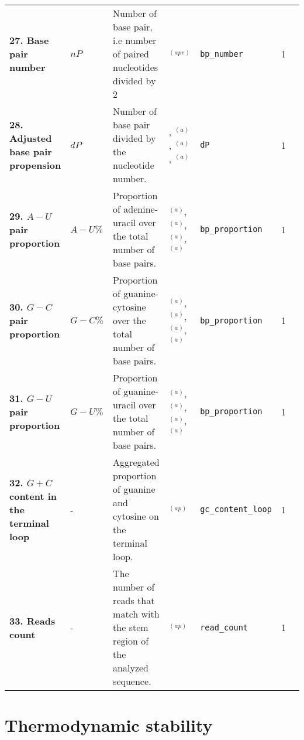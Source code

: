\documentclass[a4paper,10pt]{article}
\begin{document}
\begin{longtable}{ >{\raggedright\arraybackslash}p{4.2cm}  p{1.6cm}  p{5.8cm}  p{1.2cm}  l  cp{1cm} }
\bfseries{27. Base pair number} & $nP$ & Number of base pair, i.e number of paired nucleotides divided by 2 & \cite{MM06}$^{(apv)}$ & \verb|bp_number| & 1 \\

\bfseries{28. Adjusted base pair propension} & $dP$ & Number of base pair divided by the nucleotide number. & \cite{KS07}, \cite{RV09}$^{(a)}$, \cite{JS10}$^{(a)}$, \cite{PM11}$^{(a)}$ & \verb|dP| & 1 \\

\bfseries{29. $A-U$ pair proportion} & $A-U\%$ & Proportion of adenine-uracil over the total number of base pairs. & \cite{SP05}$^{(a)}$, \cite{RV09}$^{(a)}$, \cite{JS10}$^{(a)}$, \cite{PM11}$^{(a)}$ & \verb|bp_proportion| & 1 \\

 \bfseries{30. $G-C$ pair proportion} & $G-C\%$ & Proportion of guanine-cytosine over the total number of base pairs. & \cite{SP05}$^{(a)}$, \cite{RV09}$^{(a)}$, \cite{JS10}$^{(a)}$, \cite{PM11}$^{(a)}$ & \verb|bp_proportion| & 1 \\

 \bfseries{31. $G-U$ pair proportion} & $G-U\%$ & Proportion of guanine-uracil over the total number of base pairs. & \cite{SP05}$^{(a)}$, \cite{RV09}$^{(a)}$, \cite{JS10}$^{(a)}$, \cite{PM11}$^{(a)}$ & \verb|bp_proportion| & 1 \\

\bfseries{32. $G+C$ content in the terminal loop} & - & Aggregated proportion of guanine and cytosine on the terminal loop. & \cite{MM09}$^{(ap)}$ & \verb|gc_content_loop| & 1 \\

\bfseries{33. Reads count} & - & The number of reads that match with the stem region of the analyzed sequence.  & \cite{MM09}$^{(ap)}$ & \verb|read_count| & 1 \\

\end{longtable}




\newpage





\section{Thermodynamic stability}
\end{document}
